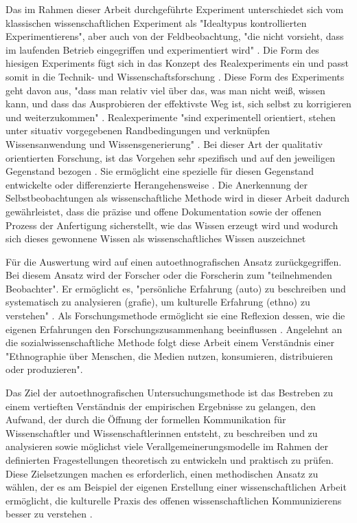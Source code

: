 Das im Rahmen dieser Arbeit durchgeführte Experiment unterschiedet sich vom klassischen wissenschaftlichen Experiment als "Idealtypus kontrollierten Experimentierens", aber auch von der Feldbeobachtung, "die nicht vorsieht, dass im laufenden Betrieb eingegriffen und experimentiert wird" \cite{Westermayer_2006}. Die Form des hiesigen Experiments fügt sich in das Konzept des Realexperiments ein und passt somit in die Technik- und Wissenschaftsforschung \cite{Westermayer_2006}. Diese Form des Experiments geht davon aus, "dass man relativ viel über das, was man nicht weiß, wissen kann, und dass das Ausprobieren der effektivste Weg ist, sich selbst zu korrigieren und weiterzukommen" \cite{Krohn_2005}. Realexperimente "sind experimentell orientiert, stehen unter situativ vorgegebenen Randbedingungen und verknüpfen Wissensanwendung und Wissensgenerierung" \cite{Westermayer_2006}. Bei dieser Art der qualitativ orientierten Forschung, ist das Vorgehen sehr spezifisch und auf den jeweiligen Gegenstand bezogen \cite{Krohn_2005}. Sie ermöglicht eine spezielle für diesen Gegenstand entwickelte oder differenzierte Herangehensweise \cite[:119]{Mayring_1999}. Die Anerkennung der Selbstbeobachtungen als wissenschaftliche Methode wird in dieser Arbeit dadurch gewährleistet, dass die präzise und offene Dokumentation sowie der offenen Prozess der Anfertigung sicherstellt, wie das Wissen erzeugt wird und wodurch sich dieses gewonnene Wissen als wissenschaftliches Wissen auszeichnet \cite{solhdju_2011_selbstexperimente}

Für die Auswertung wird auf einen autoethnografischen Ansatz zurückgegriffen. Bei diesem Ansatz wird der Forscher oder die Forscherin zum "teilnehmenden Beobachter"\cite{Ellis_2010}. Er ermöglicht es, "persönliche Erfahrung (auto) zu beschreiben und systematisch zu analysieren (grafie), um kulturelle Erfahrung (ethno) zu verstehen" \cite{Ellis_2010}. Als Forschungsmethode ermöglicht sie eine Reflexion dessen, wie die eigenen Erfahrungen den Forschungszusammenhang beeinflussen \cite{ellis_2011_autoethnography}. Angelehnt an die sozialwissenschaftliche Methode folgt diese Arbeit einem Verständnis einer "Ethnographie über Menschen, die Medien nutzen, konsumieren, distribuieren oder produzieren"\cite{bachmann_2011_ethnographie}.

Das Ziel der autoethnografischen Untersuchungsmethode ist das Bestreben zu einem vertieften Verständnis der empirischen Ergebnisse zu gelangen, den Aufwand, der durch die Öffnung der formellen Kommunikation für Wissenschaftler und Wissenschaftlerinnen entsteht, zu beschreiben und zu analysieren sowie möglichst viele Verallgemeinerungsmodelle im Rahmen der definierten Fragestellungen theoretisch zu entwickeln und praktisch zu prüfen. Diese Zielsetzungen machen es erforderlich, einen methodischen Ansatz zu wählen, der es am Beispiel der eigenen Erstellung einer wissenschaftlichen Arbeit ermöglicht, die kulturelle Praxis des offenen wissenschaftlichen Kommunizierens besser zu verstehen \cite{maso_2001_phenomenology}.

